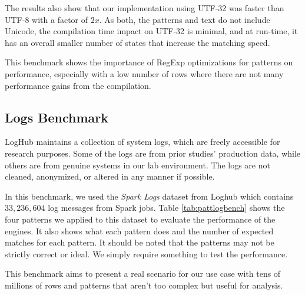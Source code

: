 The results also show that our implementation using UTF-32 was faster than UTF-8 with a factor of $2x$. As both, the patterns and text do not include Unicode, the compilation time impact on UTF-32 is minimal, and at run-time, it has an overall smaller number of states that increase the matching speed.

This benchmark shows the importance of RegExp optimizations for patterns on performance, especially with a low number of rows where there are not many performance gains from the compilation.

\subsection{Logs Benchmark}

LogHub \cite{loghub} maintains a collection of system logs, which are freely accessible for research purposes. Some of the logs are from prior studies' production data, while others are from genuine systems in our lab environment. The logs are not cleaned, anonymized, or altered in any manner if possible.

In this benchmark, we used the \textit{Spark Logs} dataset from Loghub which contains $33,236,604$ log messages from Spark jobs. Table \ref{tab:pattlogbench} shows the four patterns we applied to this dataset to evaluate the performance of the engines. It also shows what each pattern does and the number of expected matches for each pattern. It should be noted that the patterns may not be strictly correct or ideal. We simply require something to test the performance.

This benchmark aims to present a real scenario for our use case with tens of millions of rows and patterns that aren't too complex but useful for analysis.

